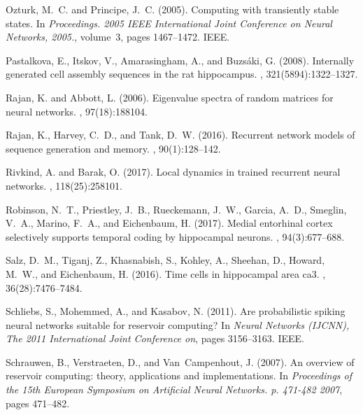 \documentclass[11pt]{article} %
\begin{document}
\begin{thebibliography}{10}
Ozturk, M.~C. and Principe, J.~C. (2005).
\newblock Computing with transiently stable states.
\newblock In {\em Proceedings. 2005 IEEE International Joint Conference on
  Neural Networks, 2005.}, volume~3, pages 1467--1472. IEEE.

Pastalkova, E., Itskov, V., Amarasingham, A., and Buzs{\'a}ki, G. (2008).
\newblock Internally generated cell assembly sequences in the rat hippocampus.
, 321(5894):1322--1327.

Rajan, K. and Abbott, L. (2006).
\newblock Eigenvalue spectra of random matrices for neural networks.
, 97(18):188104.

Rajan, K., Harvey, C.~D., and Tank, D.~W. (2016).
\newblock Recurrent network models of sequence generation and memory.
, 90(1):128--142.

Rivkind, A. and Barak, O. (2017).
\newblock Local dynamics in trained recurrent neural networks.
, 118(25):258101.

Robinson, N.~T., Priestley, J.~B., Rueckemann, J.~W., Garcia, A.~D., Smeglin,
  V.~A., Marino, F.~A., and Eichenbaum, H. (2017).
\newblock Medial entorhinal cortex selectively supports temporal coding by
  hippocampal neurons.
, 94(3):677--688.

Salz, D.~M., Tiganj, Z., Khasnabish, S., Kohley, A., Sheehan, D., Howard,
  M.~W., and Eichenbaum, H. (2016).
\newblock Time cells in hippocampal area ca3.
, 36(28):7476--7484.

Schliebs, S., Mohemmed, A., and Kasabov, N. (2011).
\newblock Are probabilistic spiking neural networks suitable for reservoir
  computing?
\newblock In {\em Neural Networks (IJCNN), The 2011 International Joint
  Conference on}, pages 3156--3163. IEEE.

Schrauwen, B., Verstraeten, D., and Van~Campenhout, J. (2007).
\newblock An overview of reservoir computing: theory, applications and
  implementations.
\newblock In {\em Proceedings of the 15th European Symposium on Artificial
  Neural Networks. p. 471-482 2007}, pages 471--482.


\end{thebibliography}
\end{document}

